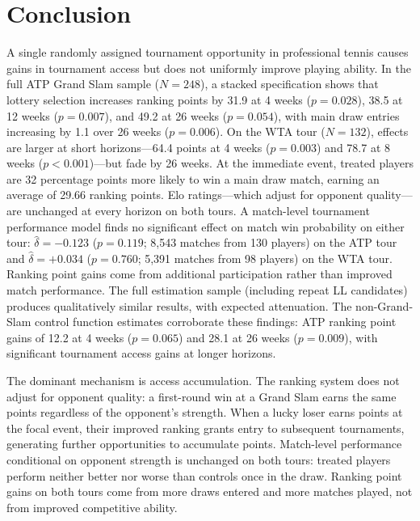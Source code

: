 \section{Conclusion}
\label{sec:conclusion}

A single randomly assigned tournament opportunity in professional tennis causes gains in tournament access but does not uniformly improve playing ability. In the full ATP Grand Slam sample ($N = 248$), a stacked specification shows that lottery selection increases ranking points by 31.9 at 4 weeks ($p = 0.028$), 38.5 at 12 weeks ($p = 0.007$), and 49.2 at 26 weeks ($p = 0.054$), with main draw entries increasing by 1.1 over 26 weeks ($p = 0.006$). On the WTA tour ($N = 132$), effects are larger at short horizons---64.4 points at 4 weeks ($p = 0.003$) and 78.7 at 8 weeks ($p < 0.001$)---but fade by 26 weeks. At the immediate event, treated players are 32 percentage points more likely to win a main draw match, earning an average of 29.66 ranking points. Elo ratings---which adjust for opponent quality---are unchanged at every horizon on both tours. A match-level tournament performance model finds no significant effect on match win probability on either tour: $\hat{\delta} = -0.123$ ($p = 0.119$; 8,543 matches from 130 players) on the ATP tour and $\hat{\delta} = +0.034$ ($p = 0.760$; 5,391 matches from 98 players) on the WTA tour. Ranking point gains come from additional participation rather than improved match performance. The full estimation sample (including repeat LL candidates) produces qualitatively similar results, with expected attenuation. The non-Grand-Slam control function estimates corroborate these findings: ATP ranking point gains of 12.2 at 4 weeks ($p = 0.065$) and 28.1 at 26 weeks ($p = 0.009$), with significant tournament access gains at longer horizons.

The dominant mechanism is access accumulation. The ranking system does not adjust for opponent quality: a first-round win at a Grand Slam earns the same points regardless of the opponent's strength. When a lucky loser earns points at the focal event, their improved ranking grants entry to subsequent tournaments, generating further opportunities to accumulate points. Match-level performance conditional on opponent strength is unchanged on both tours: treated players perform neither better nor worse than controls once in the draw. Ranking point gains on both tours come from more draws entered and more matches played, not from improved competitive ability.

